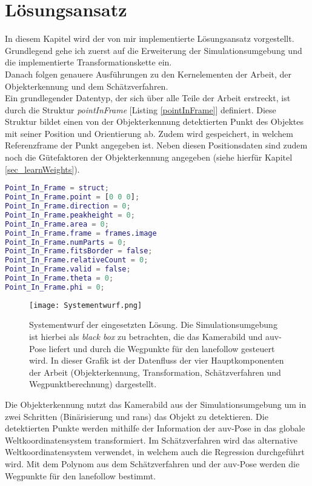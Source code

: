 \cleardoublepage
\section{Lösungsansatz}
In diesem Kapitel wird der von mir implementierte Lösungsansatz vorgestellt. Grundlegend gehe ich zuerst auf die Erweiterung der Simulationsumgebung und die implementierte Transformationskette ein.\\
Danach folgen genauere Ausführungen zu den Kernelementen der Arbeit, der Objekterkennung und dem Schätzverfahren.\\

Ein grundlegender Datentyp, der sich über alle Teile der Arbeit erstreckt, ist durch die Struktur \textit{pointInFrame} [Listing \ref{pointInFrame}] definiert. Diese Struktur bildet einen von der Objekterkennung detektierten Punkt des Objektes mit seiner Position und Orientierung ab. Zudem wird gespeichert, in welchem Referenzframe der Punkt angegeben ist. Neben diesen Positionsdaten sind zudem noch die Gütefaktoren der Objekterkennung angegeben (siehe hierfür Kapitel \ref{sec_learnWeights}).

\begin{lstlisting}[language=Matlab,caption={[Initialisierung der \textit{pointInFrame}-Struktur]Initialisierung der \textit{pointInFrame}-Struktur, die erkannte Punkte in verschiedenen Referenzkoordinatensystemen abbildet.}, label = pointInFrame]
Point_In_Frame = struct;
Point_In_Frame.point = [0 0 0];
Point_In_Frame.direction = 0;
Point_In_Frame.peakheight = 0;
Point_In_Frame.area = 0;
Point_In_Frame.frame = frames.image
Point_In_Frame.numParts = 0;
Point_In_Frame.fitsBorder = false;
Point_In_Frame.relativeCount = 0;
Point_In_Frame.valid = false;
Point_In_Frame.theta = 0;
Point_In_Frame.phi = 0;
\end{lstlisting}

\begin{figure}[H]
\texttt{[image: Systementwurf.png]}
\caption[Systementwurf]{Systementwurf der eingesetzten Lösung. Die Simulationsumgebung ist hierbei als \textit{black box} zu betrachten, die das Kamerabild und \gls{auv}-Pose liefert und durch die Wegpunkte für den \gls{lanefollow} gesteuert wird. In dieser Grafik ist der Datenfluss der vier Hauptkomponenten der Arbeit (Objekterkennung, Transformation, Schätzverfahren und Wegpunktberechnung) dargestellt.}
\end{figure}
Die Objekterkennung nutzt das Kamerabild aus der Simulationsumgebung um in zwei Schritten (Binärisierung und \gls{rans}) das Objekt zu detektieren. Die detektierten Punkte werden mithilfe der Information der \gls{auv}-Pose in das globale Weltkoordinatensystem transformiert. Im Schätzverfahren wird das alternative Weltkoordinatensystem verwendet, in welchem auch die Regression durchgeführt wird. Mit dem Polynom aus dem Schätzverfahren und der \gls{auv}-Pose werden die Wegpunkte für den \gls{lanefollow} bestimmt.


\newpage

\newpage

\newpage
